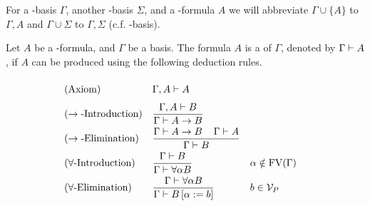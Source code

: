 For a \SysP-basis $\Gamma$, another \SysP-basis $\Sigma$, and a \SysP-formula $A$ we will abbreviate $\Gamma\cup\{A\}$ to $\Gamma,A$ and $\Gamma\cup\Sigma$ to $\Gamma,\Sigma$ (c.f. \lambdaTwo-basis).

\begin{definition}
Let $A$ be a \SysP-formula, and $\Gamma$ be a basis. The formula $A$ is a  of $\Gamma$, denoted by $\Gamma\vdash A$, if $A$ can be produced using the following deduction rules.
\begin{mdframed}
	\begingroup%
	\addtolength{\jot}{0.3cm}
	\begin{align*}
		&(\text{Axiom}) &&\Gamma,A\PModels A\vphantom{\frac{\Gamma}{\Gamma}}\\
		&(\rightarrow\text{-Introduction}) &&\frac{\Gamma,A\PModels B}{\Gamma\PModels A\to B}\\
		&(\rightarrow\text{-Elimination}) &&\frac{\Gamma\PModels A\to B \hspace{0.4cm}\Gamma\PModels A}{\Gamma\PModels B}\\ %
		  & (\forall\text{-Introduction}) &   & \frac{\Gamma\PModels B}{\Gamma\PModels \forall\alpha B} &   & \alpha\notin\FV(\Gamma) \\
		&(\forall\text{-Elimination}) &&\frac{\Gamma\PModels \forall\alpha B }{\Gamma\PModels B\left[ \alpha:=b\right] }
		&& b\in\VarP %
	\end{align*}
	\endgroup
\end{mdframed}
\end{definition}

